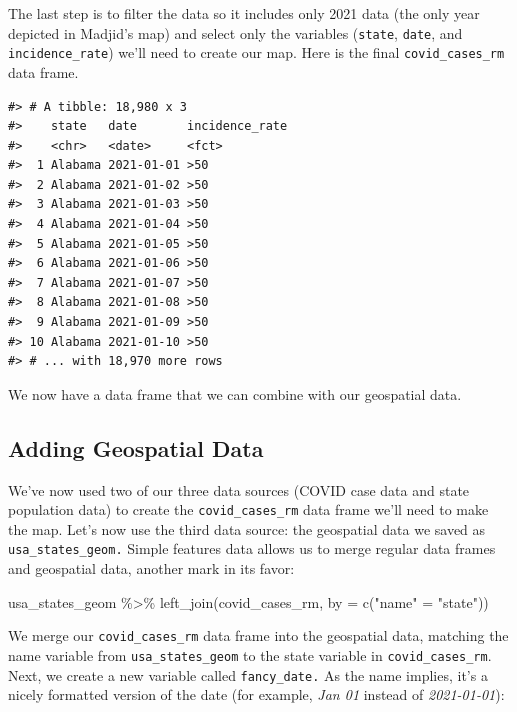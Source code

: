 \documentclass[
]{book}
\newenvironment{Shaded}{\begin{snugshade}}{\end{snugshade}}
\newcommand{\AttributeTok}[1]{\textcolor[rgb]{0.77,0.63,0.00}{#1}}
\newcommand{\FunctionTok}[1]{\textcolor[rgb]{0.00,0.00,0.00}{#1}}
\newcommand{\NormalTok}[1]{#1}
\newcommand{\OtherTok}[1]{\textcolor[rgb]{0.56,0.35,0.01}{#1}}
\newcommand{\SpecialCharTok}[1]{\textcolor[rgb]{0.00,0.00,0.00}{#1}}
\newcommand{\StringTok}[1]{\textcolor[rgb]{0.31,0.60,0.02}{#1}}
\begin{document}
The last step is to filter the data so it includes only 2021 data (the only year depicted in Madjid's map) and select only the variables (\texttt{state}, \texttt{date}, and \texttt{incidence\_rate}) we'll need to create our map. Here is the final \texttt{covid\_cases\_rm} data frame.

\begin{verbatim}
#> # A tibble: 18,980 x 3
#>    state   date       incidence_rate
#>    <chr>   <date>     <fct>         
#>  1 Alabama 2021-01-01 >50           
#>  2 Alabama 2021-01-02 >50           
#>  3 Alabama 2021-01-03 >50           
#>  4 Alabama 2021-01-04 >50           
#>  5 Alabama 2021-01-05 >50           
#>  6 Alabama 2021-01-06 >50           
#>  7 Alabama 2021-01-07 >50           
#>  8 Alabama 2021-01-08 >50           
#>  9 Alabama 2021-01-09 >50           
#> 10 Alabama 2021-01-10 >50           
#> # ... with 18,970 more rows
\end{verbatim}

We now have a data frame that we can combine with our geospatial data.

\hypertarget{adding-geospatial-data}{%
\subsection*{Adding Geospatial Data}\label{adding-geospatial-data}}

We've now used two of our three data sources (COVID case data and state population data) to create the \texttt{covid\_cases\_rm} data frame we'll need to make the map. Let's now use the third data source: the geospatial data we saved as \texttt{usa\_states\_geom.} Simple features data allows us to merge regular data frames and geospatial data, another mark in its favor:

\begin{Shaded}
\begin{Highlighting}[]
\NormalTok{usa\_states\_geom }\SpecialCharTok{\%\textgreater{}\%}
  \FunctionTok{left\_join}\NormalTok{(covid\_cases\_rm, }\AttributeTok{by =} \FunctionTok{c}\NormalTok{(}\StringTok{"name"} \OtherTok{=} \StringTok{"state"}\NormalTok{))}
\end{Highlighting}
\end{Shaded}

We merge our \texttt{covid\_cases\_rm} data frame into the geospatial data, matching the name variable from \texttt{usa\_states\_geom} to the state variable in \texttt{covid\_cases\_rm}. Next, we create a new variable called \texttt{fancy\_date.} As the name implies, it's a nicely formatted version of the date (for example, \emph{Jan 01} instead of \emph{2021-01-01}):
\end{document}
